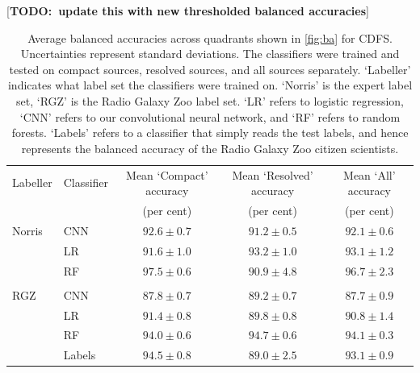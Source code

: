 \documentclass[fleqn,usenatbib,usedcolumn]{mnras}
\newcommand{\todo}[1]{ {\color{red}[{\bf TODO:~{#1}}]} }
\begin{document}
\begin{table}
  \caption{Average balanced accuracies across quadrants shown in
    \autoref{fig:ba} for CDFS. Uncertainties represent standard
    deviations. The classifiers were trained and tested on compact
    sources, resolved sources, and all sources separately. `Labeller'
    indicates what label set the classifiers were trained on. `Norris' is
    the expert label set, `RGZ' is the Radio Galaxy Zoo label set.%
    `LR' refers to logistic regression, `CNN' refers to our convolutional
    neural network, and `RF' refers to random forests. `Labels' refers to a
    classifier that simply reads the test labels, and hence represents the
    balanced accuracy of the Radio Galaxy Zoo citizen scientists.}
    \todo{update this with new thresholded balanced accuracies}
  \label{tab:average-accuracies}
  \begin{tabular}{llccc}
    \hline
    Labeller & Classifier & Mean `Compact' accuracy & Mean `Resolved' accuracy & Mean `All' accuracy\\
     & & (per cent) & (per cent) & (per cent)\\
    \hline
    Norris & CNN & $92.6 \pm 0.7$ & $91.2 \pm 0.5$ & $92.1 \pm 0.6$\\
     & LR & $91.6 \pm 1.0$ & $93.2 \pm 1.0$ & $93.1 \pm 1.2$\\
     & RF & $97.5 \pm 0.6$ & $90.9 \pm 4.8$ & $96.7 \pm 2.3$\\
     \\
    RGZ & CNN & $87.8 \pm 0.7$ & $89.2 \pm 0.7$ & $87.7 \pm 0.9$\\
     & LR & $91.4 \pm 0.8$ & $89.8 \pm 0.8$ & $90.8 \pm 1.4$\\
     & RF & $94.0 \pm 0.6$ & $94.7 \pm 0.6$ & $94.1 \pm 0.3$\\
     & Labels & $94.5 \pm 0.8$ & $89.0 \pm 2.5$ & $93.1 \pm 0.9$\\
    \hline
  \end{tabular}
\end{table}
\end{document}
